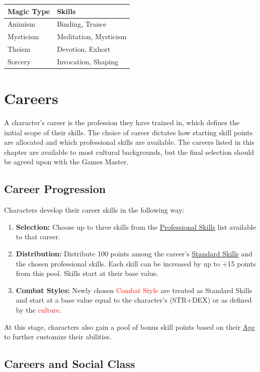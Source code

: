 \documentclass[10pt]{article}
\begin{document}
\begin{longtable}{|l|l|}
\hline
\textbf{Magic Type} & \textbf{Skills} \\
\hline
Animism & Binding, Trance \\
Mysticism & Meditation, Mysticism \\
Theism & Devotion, Exhort \\
Sorcery & Invocation, Shaping \\
\hline
\end{longtable}

\section{Careers}
\label{sec:intro}

A character’s career is the profession they have trained in, which defines the initial scope of their skills. The choice of career dictates how starting skill points are allocated and which professional skills are available. The careers listed in this chapter are available to most cultural backgrounds, but the final selection should be agreed upon with the Games Master.

\subsection{Career Progression}
\label{subsec:progression}

Characters develop their career skills in the following way:
\begin{enumerate}
    \item \textbf{Selection:} Choose up to three skills from the \hyperref[sec:skill_table]{Professional Skills} list available to that career.
    \item \textbf{Distribution:} Distribute 100 points among the career's \hyperref[sec:skill_table]{Standard Skills} and the chosen professional skills. Each skill can be increased by up to +15 points from this pool. Skills start at their base value.
    \item \textbf{Combat Styles:} Newly chosen \textcolor{red}{Combat Style} are treated as Standard Skills and start at a base value equal to the character's (STR+DEX) or as defined by the \textcolor{red}{culture}.
\end{enumerate}
At this stage, characters also gain a pool of bonus skill points based on their \hyperref[sec:ageing]{Age} to further customize their abilities.

\subsection{Careers and Social Class}
\label{subsec:social-class}
\end{document}

